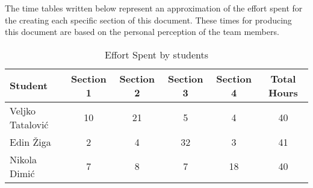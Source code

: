 The time tables written below represent an approximation of the effort spent for the
creating each specific section of this document. These times for producing this document are based on the personal perception of the team members.

\begin{table}[h!]
\centering
\begin{tabular}{|l|c|c|c|c|c|}
\hline
\textbf{Student} & \textbf{Section 1} & \textbf{Section 2} & \textbf{Section 3} & \textbf{Section 4} & \textbf{Total Hours} \\ \hline
Veljko Tatalović & 10 & 21 & 5 & 4 & 40 \\ \hline
Edin Žiga & 2 & 4 & 32 & 3 & 41 \\ \hline
Nikola Dimić & 7 & 8 & 7 & 18 & 40 \\ \hline
\end{tabular}
\caption{Effort Spent by students}
\label{tab:effort_table}
\end{table}
